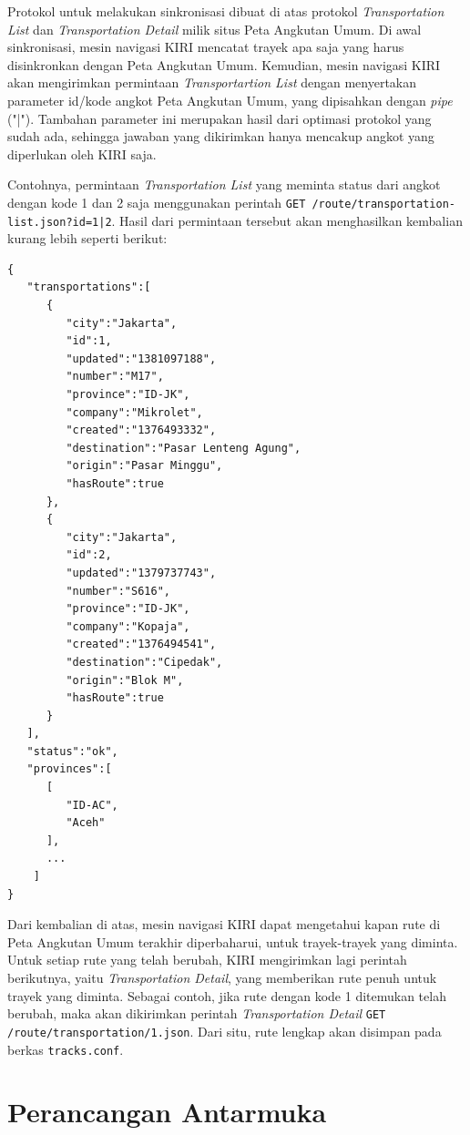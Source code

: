 Protokol untuk melakukan sinkronisasi dibuat di atas protokol \textit{Transportation List} dan \textit{Transportation Detail} milik situs Peta Angkutan Umum. Di awal sinkronisasi, mesin navigasi KIRI mencatat trayek apa saja yang harus disinkronkan dengan Peta Angkutan Umum. Kemudian, mesin navigasi KIRI akan mengirimkan permintaan \textit{Transportartion List} dengan menyertakan parameter id/kode angkot Peta Angkutan Umum, yang dipisahkan dengan \textit{pipe} ("|"). Tambahan parameter ini merupakan hasil dari optimasi protokol yang sudah ada, sehingga jawaban yang dikirimkan hanya mencakup angkot yang diperlukan oleh KIRI saja.

Contohnya, permintaan \textit{Transportation List} yang meminta status dari angkot dengan kode 1 dan 2 saja menggunakan perintah \texttt{GET /route/transportation-list.json?id=1|2}. Hasil dari permintaan tersebut akan menghasilkan kembalian kurang lebih seperti berikut:

\begin{lstlisting}
{
   "transportations":[
      {
         "city":"Jakarta",
         "id":1,
         "updated":"1381097188",
         "number":"M17",
         "province":"ID-JK",
         "company":"Mikrolet",
         "created":"1376493332",
         "destination":"Pasar Lenteng Agung",
         "origin":"Pasar Minggu",
         "hasRoute":true
      },
      {
         "city":"Jakarta",
         "id":2,
         "updated":"1379737743",
         "number":"S616",
         "province":"ID-JK",
         "company":"Kopaja",
         "created":"1376494541",
         "destination":"Cipedak",
         "origin":"Blok M",
         "hasRoute":true
      }
   ],
   "status":"ok",
   "provinces":[
      [
         "ID-AC",
         "Aceh"
      ],
      ...
    ]
}
\end{lstlisting}

Dari kembalian di atas, mesin navigasi KIRI dapat mengetahui kapan rute di Peta Angkutan Umum terakhir diperbaharui, untuk trayek-trayek yang diminta. Untuk setiap rute yang telah berubah, KIRI mengirimkan lagi perintah berikutnya, yaitu \textit{Transportation Detail}, yang memberikan rute penuh untuk trayek yang diminta. Sebagai contoh, jika rute dengan kode 1 ditemukan telah berubah, maka akan dikirimkan perintah \textit{Transportation Detail} \texttt{GET /route/transportation/1.json}. Dari situ, rute lengkap akan disimpan pada berkas \texttt{tracks.conf}.

\section{Perancangan Antarmuka}

